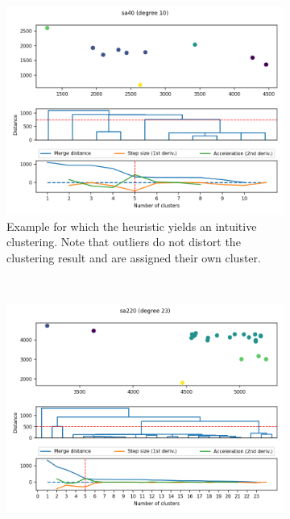 \documentclass[
	fontsize=10pt, %
	twoside=false, %
	secnumdepth=1, %
  toc=indentunnumbered %
]{kaobook}
\begin{document}
\begin{figure}[h]
  \centering
  \begin{subfigure}{0.48\linewidth}
    \includegraphics[width=1.0\textwidth]{dendrograms/sa40.png}
    \caption{
      Example for which the heuristic yields an intuitive clustering. Note that
      outliers do not distort the clustering result and are assigned their own cluster.
    }
  \end{subfigure}
  ~~~
  \begin{subfigure}{0.48\linewidth}
    \includegraphics[width=\textwidth]{dendrograms/sa220.png}

\end{subfigure}
\end{figure}
\end{document}
